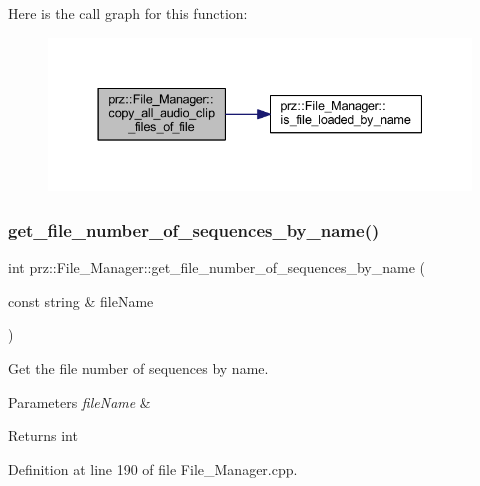 Here is the call graph for this function\+:
\nopagebreak
\begin{figure}[H]
\begin{center}
\leavevmode
\includegraphics[width=337pt]{classprz_1_1_file___manager_a56563f65f4b2cfa34e4393ae34a0afd3_cgraph}
\end{center}
\end{figure}
\mbox{\label{classprz_1_1_file___manager_abdabf8d32f9cca2d8cda41cdd7841312}} 
\subsubsection{\texorpdfstring{get\_file\_number\_of\_sequences\_by\_name()}{get\_file\_number\_of\_sequences\_by\_name()}}
{\footnotesize\ttfamily int prz\+::\+File\+\_\+\+Manager\+::get\+\_\+file\+\_\+number\+\_\+of\+\_\+sequences\+\_\+by\+\_\+name (\begin{DoxyParamCaption}\item[{const string \&}]{file\+Name }\end{DoxyParamCaption})}



Get the file number of sequences by name. 


\begin{DoxyParams}{Parameters}
{\em file\+Name} & \\
\hline
\end{DoxyParams}
\begin{DoxyReturn}{Returns}
int 
\end{DoxyReturn}


Definition at line 190 of file File\+\_\+\+Manager.\+cpp.

